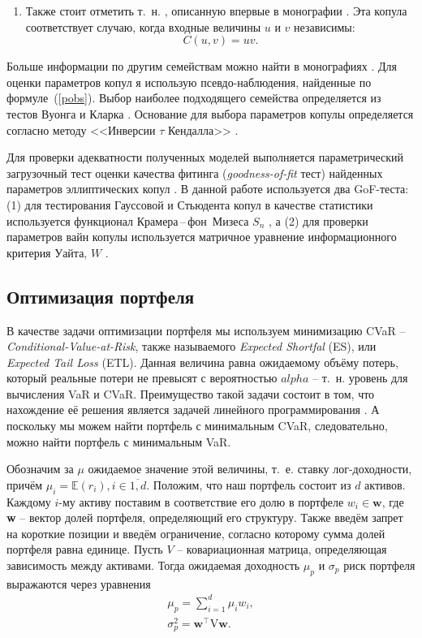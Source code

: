 \begin{enumerate}
\item Также стоит отметить т.~н. , описанную впервые в монографии \cite{Nelsen1999}. 
Эта копула соответствует случаю, когда входные величины $u$ и $v$ независимы:
\begin{equation}
    C(u,v) = uv. \nonumber
\end{equation} 
\end{enumerate}

Больше информации по другим семействам можно найти в монографиях \cite{Joe2014, Nelsen1999}.
Для оценки параметров копул я использую псевдо-наблюдения, найденные по формуле~(\ref{pobs}). 
Выбор наиболее подходящего семейства определяется из тестов Вуонга и Кларка \cite{Clarke2007, Vuong1989}. 
Основание для выбора параметров копулы определяется согласно методу <<Инверсии $\tau$ Кендалла>> \cite{Koj2010}. 

Для проверки адекватности полученных моделей выполняется параметрический загрузочный тест оценки качества фитинга (\textit{goodness-of-fit} тест) найденных параметров эллиптических копул \cite{Gen2009}.
В данной работе используется два GoF-теста: (1) для тестирования Гауссовой и Стьюдента копул в качестве статистики используется функционал Крамера\,--\,фон~Мизеса $S_n$ \cite{Gen2009}, а (2) для проверки параметров вайн копулы используется матричное уравнение информационного критерия Уайта, $W$ \cite{White1982}.

\subsection{Оптимизация портфеля}

В качестве задачи оптимизации портфеля мы используем минимизацию CVaR -- \textit{Conditional-Value-at-Risk}, также называемого \textit{Expected Shortfal} (ES), или \textit{Expected Tail Loss} (ETL). 
Данная величина равна ожидаемому объёму потерь, который реальные потери не превысят с вероятностью $alpha$ -- т.~н. уровень для вычисления VaR и CVaR.
Преимущество такой задачи состоит в том, что нахождение её решения является задачей линейного программирования \cite{Rock2000}. 
А поскольку мы можем найти портфель с минимальным CVaR, следовательно, можно найти портфель с минимальным VaR. 

Обозначим за $\mu$ ожидаемое значение этой величины, т.~е. ставку лог-доходности, причём $\mu_i = \mathbb{E}(r_i), i \in \overline{1,d}$. 
Положим, что наш портфель состоит из $d$ активов. 
Каждому $i$-му активу поставим в соответствие его долю в портфеле $w_i \in \textbf{w}$, где \textbf{w} -- вектор долей портфеля, определяющий его структуру. 
Также введём запрет на короткие позиции и введём ограничение, согласно которому сумма долей портфеля равна единице.
Пусть $V$ -- ковариационная матрица, определяющая зависимость между активами.
Тогда ожидаемая доходность $\mu_p$ и $\sigma_p$ риск портфеля выражаются через уравнения
%
\begin{gather}\label{portretandrisk}
\mu_p = \sum_{i=1}^d \mu_i w_i,\\
\sigma_p^2 = \textbf{w}^\intercal \text{V} \textbf{w}.
\end{gather}
 
